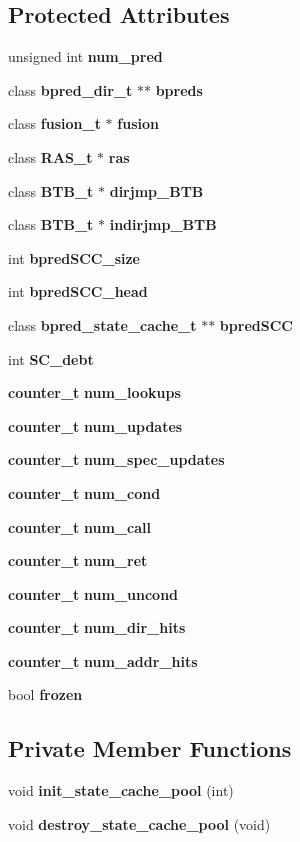 \subsection*{Protected Attributes}
\begin{CompactItemize}
\item 
unsigned int {\bf num\_\-pred}
\item 
class {\bf bpred\_\-dir\_\-t} $\ast$$\ast$ {\bf bpreds}
\item 
class {\bf fusion\_\-t} $\ast$ {\bf fusion}
\item 
class {\bf RAS\_\-t} $\ast$ {\bf ras}
\item 
class {\bf BTB\_\-t} $\ast$ {\bf dirjmp\_\-BTB}
\item 
class {\bf BTB\_\-t} $\ast$ {\bf indirjmp\_\-BTB}
\item 
int {\bf bpredSCC\_\-size}
\item 
int {\bf bpredSCC\_\-head}
\item 
class {\bf bpred\_\-state\_\-cache\_\-t} $\ast$$\ast$ {\bf bpredSCC}
\item 
int {\bf SC\_\-debt}
\item 
{\bf counter\_\-t} {\bf num\_\-lookups}
\item 
{\bf counter\_\-t} {\bf num\_\-updates}
\item 
{\bf counter\_\-t} {\bf num\_\-spec\_\-updates}
\item 
{\bf counter\_\-t} {\bf num\_\-cond}
\item 
{\bf counter\_\-t} {\bf num\_\-call}
\item 
{\bf counter\_\-t} {\bf num\_\-ret}
\item 
{\bf counter\_\-t} {\bf num\_\-uncond}
\item 
{\bf counter\_\-t} {\bf num\_\-dir\_\-hits}
\item 
{\bf counter\_\-t} {\bf num\_\-addr\_\-hits}
\item 
bool {\bf frozen}
\end{CompactItemize}
\subsection*{Private Member Functions}
\begin{CompactItemize}
\item 
void {\bf init\_\-state\_\-cache\_\-pool} (int)
\item 
void {\bf destroy\_\-state\_\-cache\_\-pool} (void)
\end{CompactItemize}


